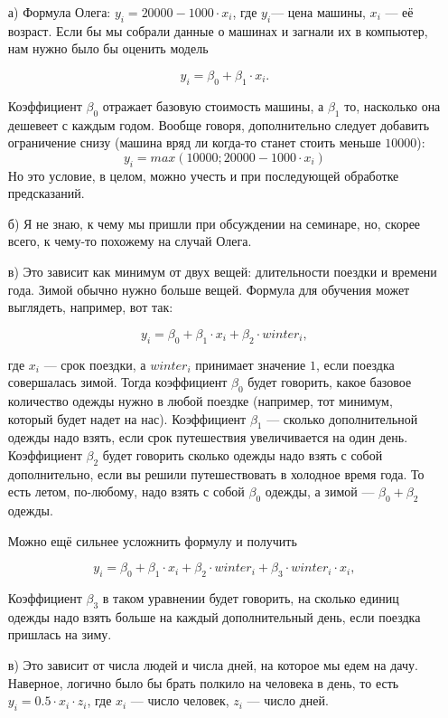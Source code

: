 \documentclass[12pt, a4paper, oneside]{article}
\theoremstyle{plain} %
\theoremstyle{definition}
\begin{document}
\begin{solution}
	\begin{enumerate}
		\item[а)]  Формула Олега: $y_i = 20000 - 1000 \cdot x_i$, где $y_i$--- цена машины, $x_i$ --- её возраст. Если бы мы собрали данные о машинах и загнали их в компьютер, нам нужно было бы оценить модель
		
		\[ y_i = \beta_0 + \beta_1 \cdot  x_i.\]
		
		Коэффициент $\beta_0$ отражает базовую стоимость машины, а $\beta_1$ то, насколько она дешевеет с каждым годом.
		Вообще говоря, дополнительно следует добавить ограничение снизу (машина вряд ли когда-то станет стоить меньше $10000$):
		$$
		y_i = max(10000; 20000 - 1000 \cdot x_i)
		$$
		Но это условие, в целом, можно учесть и при последующей обработке предсказаний.
		
		\item[б)]  Я не знаю, к чему мы пришли при обсуждении на семинаре, но, скорее всего, к чему-то похожему на случай Олега. 
		
		\item[в)]  Это зависит как минимум от двух вещей: длительности поездки и времени года. Зимой обычно нужно больше вещей. Формула для обучения может выглядеть, например, вот так: 
		
		\[ 
		y_i = \beta_0 + \beta_1 \cdot  x_i + \beta_2 \cdot winter_i,
		\]
		
		где $x_i$ --- срок поездки, а $winter_i$ принимает значение $1$, если поездка совершалась зимой. Тогда коэффициент $\beta_0$ будет говорить, какое базовое количество одежды нужно в любой поездке (например, тот минимум, который будет надет на нас). Коэффициент $\beta_1$ --- сколько дополнительной одежды надо взять, если срок путешествия увеличивается на один день. Коэффициент $\beta_2$ будет говорить сколько одежды надо взять с собой дополнительно, если вы решили путешествовать в холодное время года. То есть летом, по-любому, надо взять с собой $\beta_0$ одежды, а зимой --- $\beta_0 + \beta_2$ одежды.
		
		Можно ещё сильнее усложнить формулу и получить 
		
		\[ 
		y_i = \beta_0 + \beta_1 \cdot  x_i + \beta_2 \cdot winter_i + \beta_3 \cdot winter_i \cdot x_i,
		\]		
		
		Коэффициент $\beta_3$ в таком уравнении будет говорить, на сколько единиц одежды надо взять больше на каждый дополнительный день, если поездка пришлась на зиму. 
		
		\item[в)]   Это зависит от числа людей и числа дней, на которое мы едем на дачу. Наверное, логично было бы брать полкило на человека в день, то есть $y_i = 0.5 \cdot x_i \cdot z_i$, где $x_i$ --- число человек, $z_i$ --- число дней. 
		

\end{enumerate}
\end{solution}
\end{document}
